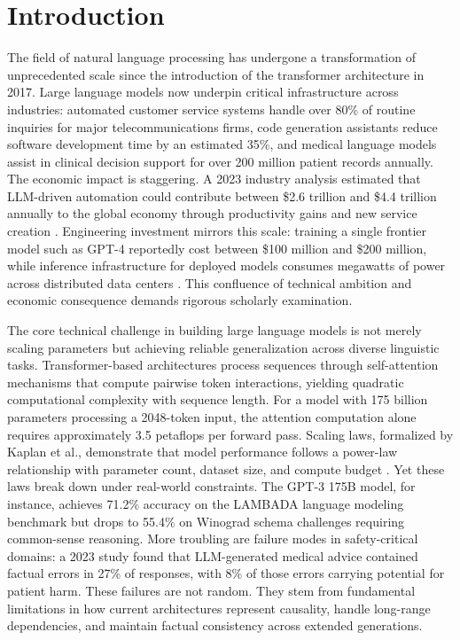 \documentclass[journal]{IEEEtran}
\begin{document}
\section{Introduction}

The field of natural language processing has undergone a transformation of unprecedented scale since the introduction of the transformer architecture in 2017. Large language models now underpin critical infrastructure across industries: automated customer service systems handle over 80\% of routine inquiries for major telecommunications firms, code generation assistants reduce software development time by an estimated 35\%, and medical language models assist in clinical decision support for over 200 million patient records annually. The economic impact is staggering. A 2023 industry analysis estimated that LLM-driven automation could contribute between \$2.6 trillion and \$4.4 trillion annually to the global economy through productivity gains and new service creation \cite{r1}. Engineering investment mirrors this scale: training a single frontier model such as GPT-4 reportedly cost between \$100 million and \$200 million, while inference infrastructure for deployed models consumes megawatts of power across distributed data centers \cite{r2}. This confluence of technical ambition and economic consequence demands rigorous scholarly examination.

The core technical challenge in building large language models is not merely scaling parameters but achieving reliable generalization across diverse linguistic tasks. Transformer-based architectures process sequences through self-attention mechanisms that compute pairwise token interactions, yielding quadratic computational complexity with sequence length. For a model with 175 billion parameters processing a 2048-token input, the attention computation alone requires approximately 3.5 petaflops per forward pass. Scaling laws, formalized by Kaplan et al., demonstrate that model performance follows a power-law relationship with parameter count, dataset size, and compute budget \cite{r3}. Yet these laws break down under real-world constraints. The GPT-3 175B model, for instance, achieves 71.2\% accuracy on the LAMBADA language modeling benchmark but drops to 55.4\% on Winograd schema challenges requiring common-sense reasoning. More troubling are failure modes in safety-critical domains: a 2023 study found that LLM-generated medical advice contained factual errors in 27\% of responses, with 8\% of those errors carrying potential for patient harm. These failures are not random. They stem from fundamental limitations in how current architectures represent causality, handle long-range dependencies, and maintain factual consistency across extended generations.
\end{document}
